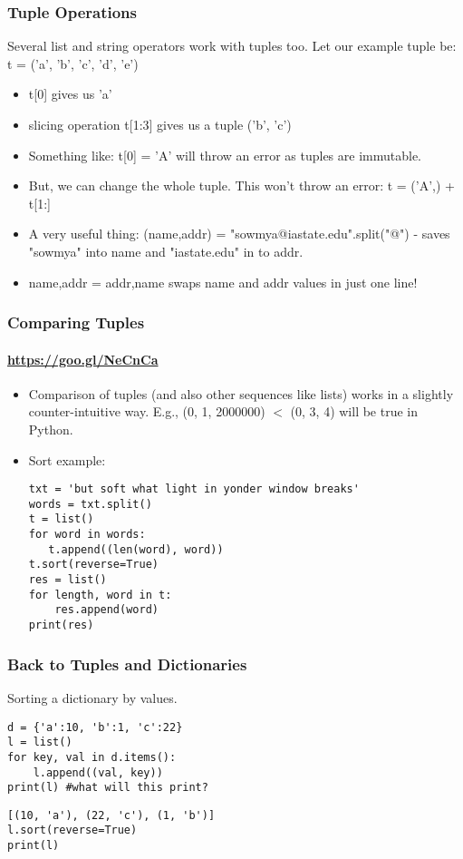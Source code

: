 \documentclass{beamer}
\begin{document}
\begin{frame}[fragile]
\frametitle{Tuple Operations}
Several list and string operators work with tuples too. Let our example tuple be: t = ('a', 'b', 'c', 'd', 'e')
\begin{itemize}
\item t[0] gives us 'a'
\item slicing operation t[1:3] gives us a tuple ('b', 'c')
\item Something like: t[0] = 'A' will throw an error as tuples are immutable.
\item But, we can change the whole tuple. This won't throw an error: t = ('A',) + t[1:]
\item A very useful thing: (name,addr) = "sowmya@iastate.edu".split("@") - saves "sowmya" into name and "iastate.edu" in to addr.
\item name,addr = addr,name swaps name and addr values in just one line!
\end{itemize}
\end{frame}

\begin{frame}[fragile] %
\frametitle{Comparing Tuples}
\framesubtitle{\url{https://goo.gl/NeCnCa}}
\begin{itemize}
\item Comparison of tuples (and also other sequences like lists) works in a slightly counter-intuitive way. E.g., (0, 1, 2000000) $<$ (0, 3, 4) will be true in Python. \pause
\item Sort example:
\begin{verbatim}
txt = 'but soft what light in yonder window breaks'
words = txt.split()
t = list()
for word in words:
   t.append((len(word), word))
t.sort(reverse=True)
res = list()
for length, word in t:
    res.append(word)
print(res)
\end{verbatim}
\end{itemize}
\end{frame}

\begin{frame}[fragile] %
\frametitle{Back to Tuples and Dictionaries}
Sorting a dictionary by values.
\begin{verbatim}
d = {'a':10, 'b':1, 'c':22}
l = list()
for key, val in d.items():
    l.append((val, key))
print(l) #what will this print?
\end{verbatim} \pause
\begin{verbatim}
[(10, 'a'), (22, 'c'), (1, 'b')]
l.sort(reverse=True)
print(l)
\end{verbatim}
\end{frame}
\end{document}
